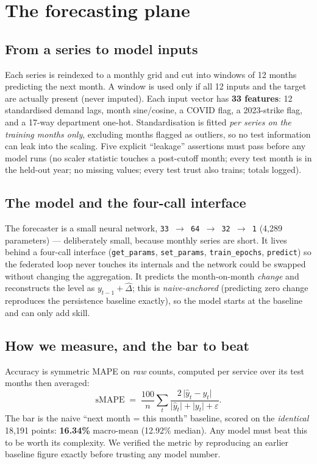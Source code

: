 \documentclass[11pt,a4paper]{article}
\newcommand{\code}[1]{\texttt{\small #1}}
\begin{document}
\section{The forecasting plane}\label{sec:forecast}

\subsection{From a series to model inputs}
Each series is reindexed to a monthly grid and cut into windows of 12 months predicting the next month.
A window is used only if all 12 inputs and the target are actually present (never imputed). Each input
vector has \textbf{33 features}: 12 standardised demand lags, month sine/cosine, a COVID flag, a
2023-strike flag, and a 17-way department one-hot. Standardisation is fitted \emph{per series on the
training months only}, excluding months flagged as outliers, so no test information can leak into the
scaling. Five explicit ``leakage'' assertions must pass before any model runs (no scaler statistic
touches a post-cutoff month; every test month is in the held-out year; no missing values; every test
trust also trains; totals logged).

\subsection{The model and the four-call interface}
The forecaster is a small neural network, \code{33\,$\to$\,64\,$\to$\,32\,$\to$\,1} (4{,}289
parameters) --- deliberately small, because monthly series are short. It lives behind a four-call
interface (\code{get\_params}, \code{set\_params}, \code{train\_epochs}, \code{predict}) so the federated
loop never touches its internals and the network could be swapped without changing the aggregation. It
predicts the month-on-month \emph{change} and reconstructs the level as $y_{t-1}+\widehat{\Delta}$; this
is \emph{naive-anchored} (predicting zero change reproduces the persistence baseline exactly), so the
model starts at the baseline and can only add skill.

\subsection{How we measure, and the bar to beat}
Accuracy is symmetric MAPE on \emph{raw} counts, computed per service over its test months then averaged:
\[
\mathrm{sMAPE} \;=\; \frac{100}{n}\sum_{t}\frac{2\,\lvert \hat y_t - y_t\rvert}{\lvert \hat y_t\rvert + \lvert y_t\rvert + \varepsilon}.
\]
The bar is the naive ``next month = this month'' baseline, scored on the \emph{identical} 18{,}191
points: \textbf{16.34\%} macro-mean (12.92\% median). Any model must beat this to be worth its
complexity. We verified the metric by reproducing an earlier baseline figure exactly before trusting any
model number.
\end{document}
